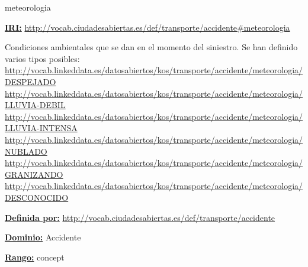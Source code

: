 \begin{mybox}{meteorologia}
\begin{flushleft}
\underline{\textbf{IRI:}}
\url{http://vocab.ciudadesabiertas.es/def/transporte/accidente#meteorologia}
\newline

Condiciones ambientales que se dan en el momento del siniestro. Se han definido varios tipos posibles:
\newline \url{http://vocab.linkeddata.es/datosabiertos/kos/transporte/accidente/meteorologia/DESPEJADO}
\newline \url{http://vocab.linkeddata.es/datosabiertos/kos/transporte/accidente/meteorologia/LLUVIA-DEBIL}
\newline \url{http://vocab.linkeddata.es/datosabiertos/kos/transporte/accidente/meteorologia/LLUVIA-INTENSA}
\newline \url{http://vocab.linkeddata.es/datosabiertos/kos/transporte/accidente/meteorologia/NUBLADO}
\newline \url{http://vocab.linkeddata.es/datosabiertos/kos/transporte/accidente/meteorologia/GRANIZANDO}
\newline \url{http://vocab.linkeddata.es/datosabiertos/kos/transporte/accidente/meteorologia/DESCONOCIDO}
\newline

\underline{\textbf{Definida por:}}\newline
\url{http://vocab.ciudadesabiertas.es/def/transporte/accidente}
\newline

\underline{\textbf{Dominio:}}  Accidente
\newline

\underline{\textbf{Rango:}} concept
\newline

\end{flushleft}
\end{mybox}


